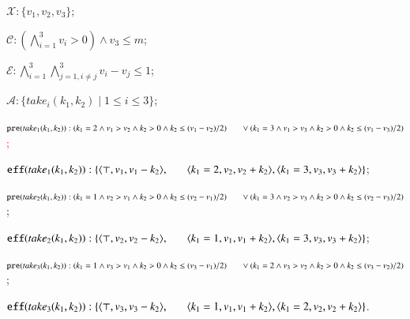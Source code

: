 \documentclass[review]{elsarticle}
\newcommand{\set}[1]{\{ #1 \}}
\newcommand{\tuple}[1]{\langle {#1} \rangle}
\newcommand{\true}{\top}
\newcommand{\statevar}{\mathcal{X}}
\newcommand{\act}{\mathcal{A}}
\newcommand{\constraint}{\mathcal{C}}
\newcommand{\estate}{\mathcal{E}}
\newcommand{\pre}{\mathtt{pre}}
\newcommand{\eff}{\mathtt{eff}}
\begin{document}
\begin{itemize}
	\item $\statevar: \set{v_1, v_2, v_3}$;
	\item $\constraint:(\bigwedge_{i=1}^{3} v_i > 0) \wedge  v_3 \le m$;
	\item $\estate: \bigwedge_{i=1}^{3}\bigwedge_{j=1,i\neq j}^{3} v_i - v_j \le 1$;
	\item $\act: \set{take_i(k_1, k_2){\mid}1\le i \le3 }$;
	\textcolor{red}{\item $\pre(take_1(k_1, k_2)) : (k_1 = 2 \wedge v_1 > v_2 \wedge k_2 > 0 \wedge k_2 \le (v_1 - v_2)/2) \\ \hspace*{6mm}  \vee (k_1 = 3 \wedge v_1 > v_3 \wedge k_2 > 0 \wedge k_2 \le (v_1 - v_3)/2) $;}
	\item $\eff(take_1(k_1, k_2)) : \set{\tuple{\true,v_1,v_1 - k_2},\\ \hspace*{6mm}
		\tuple{k_1=2,v_2,v_2 + k_2},\tuple{k_1=3,v_3,v_3 + k_2}}$;
	\item $\pre(take_2(k_1, k_2)) : (k_1 = 1 \wedge v_2 > v_1 \wedge k_2 > 0 \wedge k_2 \le (v_2 - v_1)/2)  \\ \hspace*{6mm}
	\vee (k_1 = 3 \wedge v_2 > v_3 \wedge k_2 > 0 \wedge k_2 \le (v_2 - v_3)/2) $;
	\item $\eff(take_2(k_1, k_2)) : \set{\tuple{\true,v_2,v_2 - k_2},\\ \hspace*{6mm}
		\tuple{k_1=1,v_1,v_1 + k_2},\tuple{k_1=3,v_3,v_3 + k_2}}$;
	\item $\pre(take_3(k_1, k_2)) : (k_1 = 1 \wedge v_3 > v_1 \wedge k_2 > 0 \wedge k_2 \le (v_3 - v_1)/2)  \\ \hspace*{6mm} 
	\vee (k_1 = 2 \wedge v_3 > v_2 \wedge k_2 > 0 \wedge k_2 \le (v_3 - v_2)/2) $;
	\item $\eff(take_3(k_1, k_2)) : \set{\tuple{\true,v_3,v_3 - k_2},\\ \hspace*{6mm}
		\tuple{k_1=1,v_1,v_1 + k_2},\tuple{k_1=2,v_2,v_2 + k_2}}$.
\end{itemize}
\end{document}
